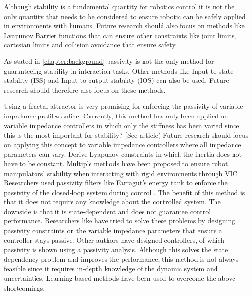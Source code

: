 
Although stability is a fundamental quantity for robotics control it is not the only quantity that needs to be considered to ensure robotic can be safely applied in environments with humans. Future research should also focus on methods like Lyapunov Barrier functions that can ensure other constraints like joint limits, cartesian limits and collision avoidance that ensure safety \cite{amesControlBarrierFunctions2019,saverianoLearningBarrierFunctions2019}.

As stated in \ref{chapter:background} passivity is not the only method for guaranteeing stability in interaction tasks. Other methods like Input-to-state stability (ISS) and Input-to-output stability (IOS) can also be used. Future research should therefore also focus on these methods.




Using a fractal attractor is very promising for enforcing the passivity of variable impedance profiles online. Currently, this method has only been applied on variable impedance controllers in which only the stiffness has been varied since this is the most important for stability? (See article) Future research should focus on applying this concept to variable impedance controllers where all impedance parameters can vary.
Derive Lyapunov constraints in which the inertia does not have to be constant.
Multiple methods have been proposed to ensure robot manipulators' stability when interacting with rigid environments through VIC. Researchers used passivity filters like Farragut's energy tank to enforce the passivity of the closed-loop system during control \cite{ferragutiTankbasedApproachImpedance2013}. The benefit of this method is that it does not require any knowledge about the controlled system. The downside is that it is state-dependent and does not guarantee control performance. Researchers like \cite{kronanderStabilityConsiderationsVariable2016}have tried to solve these problems by designing passivity constraints on the variable impedance parameters that ensure a controller stays passive. Other authors have designed controllers, of which passivity is shown using a passivity analysis. Although this solves the state dependency problem and improves the performance, this method is not always feasible since it requires in-depth knowledge of the dynamic system and uncertainties. Learning-based methods have been used to overcome the above shortcomings.

